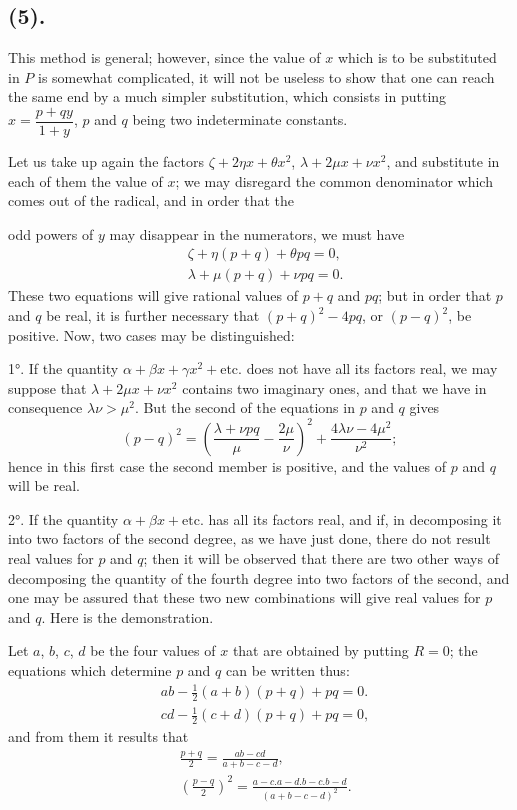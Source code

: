 \documentclass{article}
\begin{document}
\subsection*{(5).}

This method is general; however, since the value of $x$ which is to be substituted in $P$ is somewhat complicated, it will not be useless to show that one can reach the same end by a much simpler substitution, which consists in putting $x=\dfrac{p+qy}{1+y}$, $p$ and $q$ being two indeterminate constants.

Let us take up again the factors $\zeta+2\eta x+\theta x^{2}$, $\lambda+2\mu x+\nu x^{2}$, and substitute in each of them the value of $x$; we may disregard the common denominator which comes out of the radical, and in order that the

odd powers of $y$ may disappear in the numerators, we must have
\[ \begin{aligned} &\zeta+\eta(p+q)+\theta pq=0,\\ &\lambda+\mu(p+q)+\nu pq=0. \end{aligned} \]
These two equations will give rational values of $p+q$ and $pq$; but in order that $p$ and $q$ be real, it is further necessary that $(p+q)^{2}-4pq$, or $(p-q)^{2}$, be positive. Now, two cases may be distinguished:

1°. If the quantity $\alpha+\beta x+\gamma x^{2}+\text{etc.}$ does not have all its factors real, we may suppose that $\lambda+2\mu x+\nu x^{2}$ contains two imaginary ones, and that we have in consequence $\lambda\nu>\mu^{2}$. But the second of the equations in $p$ and $q$ gives
\[ (p-q)^{2}=\left(\frac{\lambda+\nu pq}{\mu}-\frac{2\mu}{\nu}\right)^{2}+\frac{4\lambda\nu-4\mu^{2}}{\nu^{2}}; \]
hence in this first case the second member is positive, and the values of $p$ and $q$ will be real.

2°. If the quantity $\alpha+\beta x+\text{etc.}$ has all its factors real, and if, in decomposing it into two factors of the second degree, as we have just done, there do not result real values for $p$ and $q$; then it will be observed that there are two other ways of decomposing the quantity of the fourth degree into two factors of the second, and one may be assured that these two new combinations will give real values for $p$ and $q$. Here is the demonstration.

Let $a$, $b$, $c$, $d$ be the four values of $x$ that are obtained by putting $R=0$; the equations which determine $p$ and $q$ can be written thus:
\[ \begin{aligned} &ab-\tfrac{1}{2}(a+b)(p+q)+pq=0.\\ &cd-\tfrac{1}{2}(c+d)(p+q)+pq=0, \end{aligned} \]
and from them it results that
\[ \begin{aligned} &\frac{p+q}{2}=\frac{ab-cd}{a+b-c-d},\\ &\left(\frac{p-q}{2}\right)^{2}=\frac{a-c.a-d.b-c.b-d}{(a+b-c-d)^{2}}. \end{aligned} \]
\end{document}
